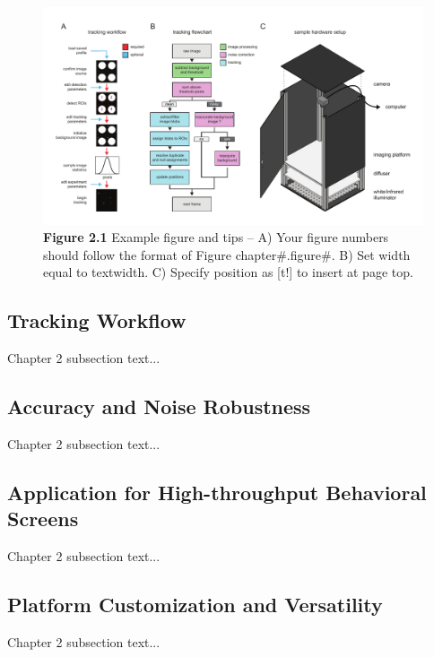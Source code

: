 \documentclass[12pt,letterpaper]{article}
\begin{document}
\begin{figure}[t!]
    \includegraphics[width=\textwidth]{../figures/chapter_2/fig_2-1.pdf}
    \vspace{.1in}
    \caption*{\textbf{Figure 2.1} Example figure and tips -- A) Your figure numbers should follow the format of Figure chapter#.figure#. B) Set width equal to textwidth. C) Specify position as [t!] to insert at page top.}
\end{figure}

\subsection{Tracking Workflow}

Chapter 2 subsection text...

\subsection{Accuracy and Noise Robustness}

Chapter 2 subsection text...

\subsection{Application for High-throughput Behavioral Screens}

Chapter 2 subsection text...

\subsection{Platform Customization and Versatility}

Chapter 2 subsection text...

\end{document}
